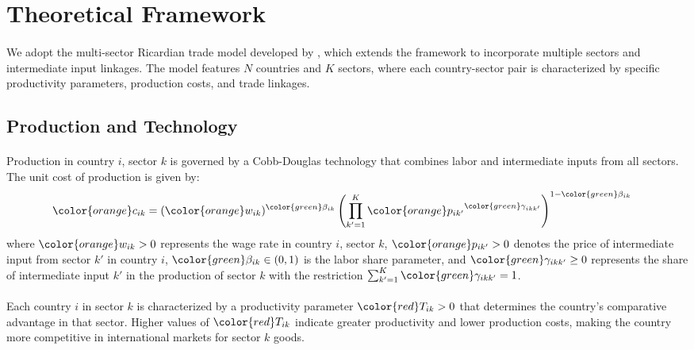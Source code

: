 \section{Theoretical Framework}

\paragraph{} We adopt the multi-sector Ricardian trade model developed by \cite{costinot2012TheReviewofEconomicStudies}, which extends the \cite{eaton2002Econometrica} framework to incorporate multiple sectors and intermediate input linkages. The model features $N$ countries and $K$ sectors, where each country-sector pair is characterized by specific productivity parameters, production costs, and trade linkages.

\subsection{Production and Technology}

\paragraph{} Production in country $i$, sector $k$ is governed by a Cobb-Douglas technology that combines labor and intermediate inputs from all sectors. The unit cost of production is given by:
\begin{align*}
    {\color{orange}c_{ik}} &= ({\color{orange}w_{ik}})^{{\color{green}\beta_{ik}}} \left(\prod_{k'=1}^{K} {\color{orange}p_{ik'}}^{{\color{green}\gamma_{ikk'}}}\right)^{1 - {\color{green}\beta_{ik}}}
    \label{eq:unit_cost}
\end{align*}
where ${\color{orange}w_{ik}} > 0$ represents the wage rate in country $i$, sector $k$, ${\color{orange}p_{ik'}} > 0$ denotes the price of intermediate input from sector $k'$ in country $i$, ${\color{green}\beta_{ik}} \in (0,1)$ is the labor share parameter, and ${\color{green}\gamma_{ikk'}} \geq 0$ represents the share of intermediate input $k'$ in the production of sector $k$ with the restriction $\sum_{k'=1}^{K} {\color{green}\gamma_{ikk'}} = 1$. 

\paragraph{} Each country $i$ in sector $k$ is characterized by a productivity parameter ${\color{red}T_{ik}} > 0$ that determines the country's comparative advantage in that sector. Higher values of ${\color{red}T_{ik}}$ indicate greater productivity and lower production costs, making the country more competitive in international markets for sector $k$ goods.

